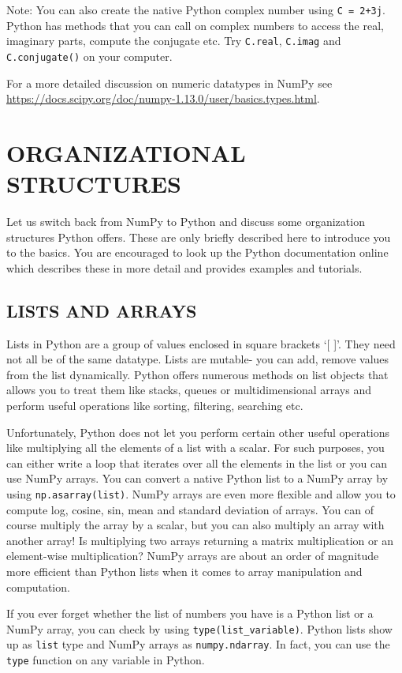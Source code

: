 \documentclass[psfig,preprint]{aastex}
\begin{document}
Note: You can also create the native Python complex number using 
{\tt C = 2+3j}. Python has methods that you can call on complex numbers to access 
the real, imaginary parts, compute the conjugate etc. Try {\tt C.real}, 
{\tt C.imag} and {\tt C.conjugate()} on your computer.

For a more detailed discussion on numeric datatypes in NumPy see \url{https://docs.scipy.org/doc/numpy-1.13.0/user/basics.types.html}.

\section{ORGANIZATIONAL STRUCTURES}

Let us switch back from NumPy to Python and discuss some organization 
structures Python offers. These are only briefly described here to 
introduce you to the basics. You are encouraged to look up the Python 
documentation online which describes these in more detail and provides 
examples and tutorials.

\subsection{LISTS AND ARRAYS}
Lists in Python are a group of values enclosed in square brackets `[ ]'. They 
need not all be of the same datatype. Lists are mutable- you can add, 
remove values from the list dynamically. Python offers numerous methods on list 
objects that allows you to treat them like stacks, queues or multidimensional 
arrays and perform useful operations like sorting, filtering, searching etc.

Unfortunately, Python does not let you perform certain other useful 
operations like multiplying all the elements of a list with a scalar. For 
such purposes, you can either write a loop that iterates over all the 
elements in the list or you can use NumPy arrays. You can convert a native 
Python list to a NumPy array by using {\tt np.asarray(list)}. NumPy arrays are even 
more flexible and allow you to compute log, cosine, sin, mean and standard 
deviation of arrays. You can of course multiply the array by a scalar, but you 
can also multiply an array with another array! Is multiplying two arrays 
returning a matrix multiplication or an element-wise multiplication? NumPy arrays 
are about an order of magnitude more efficient than Python lists 
when it comes to array manipulation and computation.

If you ever forget whether the list of numbers you have is a Python list or 
a NumPy array, you can check by using {\tt type(list\_variable)}. Python lists 
show up as {\tt list} type and NumPy arrays as {\tt numpy.ndarray}. In fact, 
you can use the {\tt type} function on any variable in Python.
\end{document}
